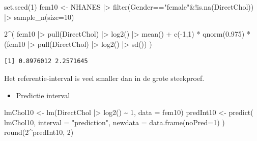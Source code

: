 \documentclass[
  dutch,
  letterpaper,
  12pt]{book}
\newenvironment{Shaded}{\begin{snugshade}}{\end{snugshade}}
\newcommand{\AttributeTok}[1]{\textcolor[rgb]{0.40,0.45,0.13}{#1}}
\newcommand{\DecValTok}[1]{\textcolor[rgb]{0.68,0.00,0.00}{#1}}
\newcommand{\FloatTok}[1]{\textcolor[rgb]{0.68,0.00,0.00}{#1}}
\newcommand{\FunctionTok}[1]{\textcolor[rgb]{0.28,0.35,0.67}{#1}}
\newcommand{\NormalTok}[1]{\textcolor[rgb]{0.00,0.23,0.31}{#1}}
\newcommand{\OtherTok}[1]{\textcolor[rgb]{0.00,0.23,0.31}{#1}}
\newcommand{\SpecialCharTok}[1]{\textcolor[rgb]{0.37,0.37,0.37}{#1}}
\newcommand{\StringTok}[1]{\textcolor[rgb]{0.13,0.47,0.30}{#1}}
\providecommand{\tightlist}{%
  \setlength{\itemsep}{0pt}\setlength{\parskip}{0pt}}
\theoremstyle{definition}
\theoremstyle{definition}
\theoremstyle{definition}
\theoremstyle{remark}
\begin{document}
\begin{Shaded}
\begin{Highlighting}[]
\FunctionTok{set.seed}\NormalTok{(}\DecValTok{1}\NormalTok{)}
\NormalTok{fem10 }\OtherTok{\textless{}{-}}\NormalTok{ NHANES }\SpecialCharTok{|\textgreater{}}
  \FunctionTok{filter}\NormalTok{(Gender}\SpecialCharTok{==}\StringTok{"female"}\SpecialCharTok{\&!}\FunctionTok{is.na}\NormalTok{(DirectChol)) }\SpecialCharTok{|\textgreater{}}
  \FunctionTok{sample\_n}\NormalTok{(}\AttributeTok{size=}\DecValTok{10}\NormalTok{)}

\DecValTok{2}\SpecialCharTok{\^{}}\NormalTok{(}
\NormalTok{  fem10 }\SpecialCharTok{|\textgreater{}}
    \FunctionTok{pull}\NormalTok{(DirectChol) }\SpecialCharTok{|\textgreater{}}
    \FunctionTok{log2}\NormalTok{() }\SpecialCharTok{|\textgreater{}}
    \FunctionTok{mean}\NormalTok{() }\SpecialCharTok{+}
      \FunctionTok{c}\NormalTok{(}\SpecialCharTok{{-}}\DecValTok{1}\NormalTok{,}\DecValTok{1}\NormalTok{) }\SpecialCharTok{*}
      \FunctionTok{qnorm}\NormalTok{(}\FloatTok{0.975}\NormalTok{) }\SpecialCharTok{*}
\NormalTok{      (fem10 }\SpecialCharTok{|\textgreater{}}
        \FunctionTok{pull}\NormalTok{(DirectChol) }\SpecialCharTok{|\textgreater{}}
        \FunctionTok{log2}\NormalTok{() }\SpecialCharTok{|\textgreater{}}
        \FunctionTok{sd}\NormalTok{())}
\NormalTok{  )}
\end{Highlighting}
\end{Shaded}

\begin{verbatim}
[1] 0.8976012 2.2571645
\end{verbatim}

Het referentie-interval is veel smaller dan in de grote steekproef.

\begin{itemize}
\tightlist
\item
  Predictie interval
\end{itemize}

\begin{Shaded}
\begin{Highlighting}[]
\NormalTok{lmChol10 }\OtherTok{\textless{}{-}} \FunctionTok{lm}\NormalTok{(DirectChol }\SpecialCharTok{|\textgreater{}} \FunctionTok{log2}\NormalTok{() }\SpecialCharTok{\textasciitilde{}} \DecValTok{1}\NormalTok{, }\AttributeTok{data =}\NormalTok{ fem10)}
\NormalTok{predInt10 }\OtherTok{\textless{}{-}} \FunctionTok{predict}\NormalTok{(}
\NormalTok{  lmChol10,}
  \AttributeTok{interval =} \StringTok{"prediction"}\NormalTok{,}
  \AttributeTok{newdata =} \FunctionTok{data.frame}\NormalTok{(}\AttributeTok{noPred=}\DecValTok{1}\NormalTok{)}
\NormalTok{  )}
\FunctionTok{round}\NormalTok{(}\DecValTok{2}\SpecialCharTok{\^{}}\NormalTok{predInt10, }\DecValTok{2}\NormalTok{)}
\end{Highlighting}
\end{Shaded}
\end{document}
